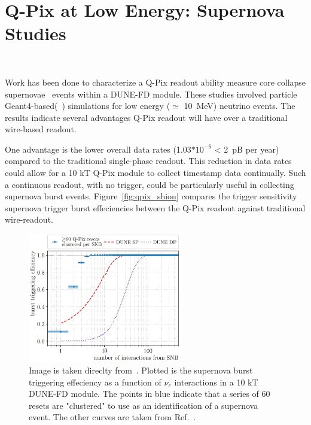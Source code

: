 \section{Q-Pix at Low Energy: Supernova Studies}~\label{sec:qpix_supernova}

Work has been done to characterize a Q-Pix readout ability measure core collapse supernovae~\citep{qpix:shion} events within a DUNE-FD module.
These studies involved particle Geant4-based(~\citep{geant4:AGOSTINELLI2003250}) simulations for low energy ($\simeq$ 10~\unit{MeV}) neutrino events.
The results indicate several advantages Q-Pix readout will have over a traditional wire-based readout.

One advantage is the lower overall data rates (1.03$*10^{-6}$ < 2~\unit{pB} per year) compared to the traditional single-phase readout.
This reduction in data rates could allow for a 10 kT Q-Pix module to collect timestamp data continually.
Such a continuous readout, with no trigger, could be particularly useful in collecting supernova burst events.
Figure~\ref{fig:qpix_shion} compares the trigger sensitivity supernova trigger burst effeciencies between the Q-Pix readout against traditional wire-readout. 

\begin{figure}[]
\centering
\includegraphics[width=0.6\textwidth]{images/shion_qpix_snb_trigger.jpg}
\caption{Image is taken direclty from~\citep{qpix:shion}.
Plotted is the supernova burst triggering effeciency as a function of $\nu_{e}$ interactions in a 10 kT DUNE-FD module.
The points in blue indicate that a series of 60 resets are "clustered" to use as an identification of a supernova event. 
The other curves are taken from Ref.~\citep{supernova_Abi_2021}.
}
\end{figure}
~\label{fig:qpix_shion}